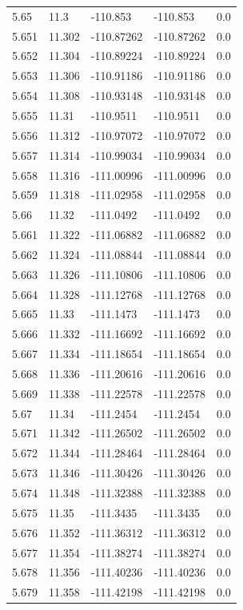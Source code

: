 \begin{tabular}{lllll}
5.65 & 11.3 & -110.853 & -110.853 & 0.0 \\
5.651 & 11.302 & -110.87262 & -110.87262 & 0.0 \\
5.652 & 11.304 & -110.89224 & -110.89224 & 0.0 \\
5.653 & 11.306 & -110.91186 & -110.91186 & 0.0 \\
5.654 & 11.308 & -110.93148 & -110.93148 & 0.0 \\
5.655 & 11.31 & -110.9511 & -110.9511 & 0.0 \\
5.656 & 11.312 & -110.97072 & -110.97072 & 0.0 \\
5.657 & 11.314 & -110.99034 & -110.99034 & 0.0 \\
5.658 & 11.316 & -111.00996 & -111.00996 & 0.0 \\
5.659 & 11.318 & -111.02958 & -111.02958 & 0.0 \\
5.66 & 11.32 & -111.0492 & -111.0492 & 0.0 \\
5.661 & 11.322 & -111.06882 & -111.06882 & 0.0 \\
5.662 & 11.324 & -111.08844 & -111.08844 & 0.0 \\
5.663 & 11.326 & -111.10806 & -111.10806 & 0.0 \\
5.664 & 11.328 & -111.12768 & -111.12768 & 0.0 \\
5.665 & 11.33 & -111.1473 & -111.1473 & 0.0 \\
5.666 & 11.332 & -111.16692 & -111.16692 & 0.0 \\
5.667 & 11.334 & -111.18654 & -111.18654 & 0.0 \\
5.668 & 11.336 & -111.20616 & -111.20616 & 0.0 \\
5.669 & 11.338 & -111.22578 & -111.22578 & 0.0 \\
5.67 & 11.34 & -111.2454 & -111.2454 & 0.0 \\
5.671 & 11.342 & -111.26502 & -111.26502 & 0.0 \\
5.672 & 11.344 & -111.28464 & -111.28464 & 0.0 \\
5.673 & 11.346 & -111.30426 & -111.30426 & 0.0 \\
5.674 & 11.348 & -111.32388 & -111.32388 & 0.0 \\
5.675 & 11.35 & -111.3435 & -111.3435 & 0.0 \\
5.676 & 11.352 & -111.36312 & -111.36312 & 0.0 \\
5.677 & 11.354 & -111.38274 & -111.38274 & 0.0 \\
5.678 & 11.356 & -111.40236 & -111.40236 & 0.0 \\
5.679 & 11.358 & -111.42198 & -111.42198 & 0.0 \\

\end{tabular}
